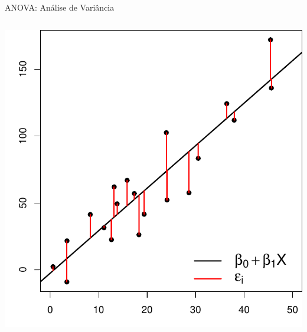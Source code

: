 \documentclass{beamer}\usepackage[]{graphicx}\usepackage[]{color}
\newenvironment{knitrout}{}{} %
\renewenvironment{knitrout}{\setlength{\topsep}{0mm}}{}
\begin{document}
\begin{frame}{ANOVA: Análise de Variância}

\begin{columns}[c]


\begin{knitrout}
\color{fgcolor}
\includegraphics[width=1\linewidth]{figure/plotreg2-1} 

\end{knitrout}

\pause



\end{columns}
\end{frame}
\end{document}
